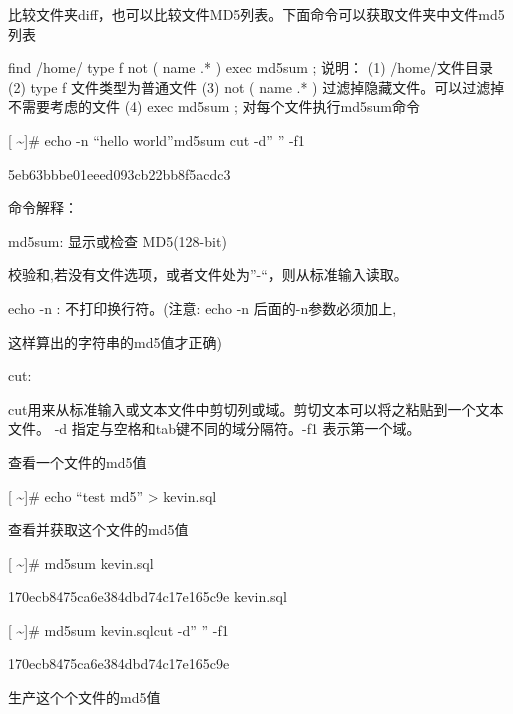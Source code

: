 \documentclass[letterpaper,12pt,english]{sphinxmanual}
\begin{document}
比较文件夹diff，也可以比较文件MD5列表。下面命令可以获取文件夹中文件md5列表

\begin{sphinxVerbatim}[commandchars=\\\{\}]
find /home/ \PYGZhy{}type f \PYGZhy{}not \PYGZbs{}( \PYGZhy{}name \PYGZsq{}.*\PYGZsq{} \PYGZbs{}) \PYGZhy{}exec md5sum \PYGZob{}\PYGZcb{} \PYGZbs{};
说明：
(1) /home/文件目录
(2) \PYGZhy{}type f 文件类型为普通文件
(3) \PYGZhy{}not \PYGZbs{}( \PYGZhy{}name \PYGZsq{}.*\PYGZsq{} \PYGZbs{})  过滤掉隐藏文件。可以过滤掉不需要考虑的文件
(4) \PYGZhy{}exec md5sum \PYGZob{}\PYGZcb{} \PYGZbs{};  对每个文件执行md5sum命令
\end{sphinxVerbatim}


{[} \textasciitilde{}{]}\# echo -n “hello world”{\color{red}\bfseries{}\textbar{}}md5sum {\color{red}\bfseries{}\textbar{}}cut -d” ” -f1

5eb63bbbe01eeed093cb22bb8f5acdc3

命令解释：

md5sum: 显示或检查 MD5(128-bit)

校验和,若没有文件选项，或者文件处为”-“，则从标准输入读取。

echo -n : 不打印换行符。(注意: echo -n 后面的-n参数必须加上,

这样算出的字符串的md5值才正确)

cut:

cut用来从标准输入或文本文件中剪切列或域。剪切文本可以将之粘贴到一个文本文件。 -d 指定与空格和tab键不同的域分隔符。-f1 表示第一个域。

查看一个文件的md5值

{[} \textasciitilde{}{]}\# echo “test md5” \textgreater{} kevin.sql

查看并获取这个文件的md5值

{[} \textasciitilde{}{]}\# md5sum kevin.sql

170ecb8475ca6e384dbd74c17e165c9e  kevin.sql

{[} \textasciitilde{}{]}\# md5sum kevin.sql\textbar{}cut -d” ” -f1

170ecb8475ca6e384dbd74c17e165c9e

生产这个个文件的md5值
\end{document}
